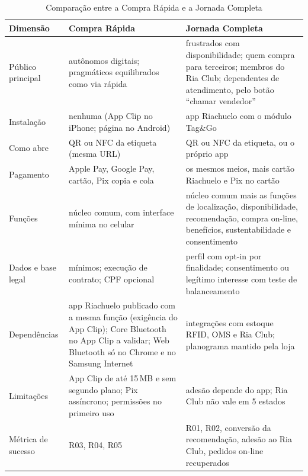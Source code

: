 \begin{table}[htbp]
    \centering
    \caption{Comparação entre a Compra Rápida e a Jornada Completa}
    \label{tab:r2-caminhos}
    \footnotesize
    \renewcommand{\arraystretch}{1.25}
    \begin{tabularx}{\textwidth}{@{}
        >{\RaggedRight\arraybackslash}p{2.5cm}
        >{\RaggedRight\arraybackslash}X
        >{\RaggedRight\arraybackslash}X@{}}
        \toprule
        \textbf{Dimensão} & \textbf{Compra Rápida} & \textbf{Jornada Completa} \\
        \midrule
        Público principal & autônomos digitais; pragmáticos equilibrados como via rápida & frustrados com disponibilidade; quem compra para terceiros; membros do Ria Club; dependentes de atendimento, pelo botão ``chamar vendedor'' \\
        Instalação & nenhuma (App Clip no iPhone; página no Android) & app Riachuelo com o módulo Tag\&Go \\
        Como abre & QR ou NFC da etiqueta (mesma URL) & QR ou NFC da etiqueta, ou o próprio app \\
        Pagamento & Apple Pay, Google Pay, cartão, Pix copia e cola & os mesmos meios, mais cartão Riachuelo e Pix no cartão \\
        Funções & núcleo comum, com interface mínima no celular & núcleo comum mais as funções de localização, disponibilidade, recomendação, compra on-line, benefícios, sustentabilidade e consentimento \\
        Dados e base legal & mínimos; execução de contrato; CPF opcional & perfil com opt-in por finalidade; consentimento ou legítimo interesse com teste de balanceamento \\
        Dependências & app Riachuelo publicado com a mesma função (exigência do App Clip); Core Bluetooth no App Clip a validar; Web Bluetooth só no Chrome e no Samsung Internet & integrações com estoque RFID, OMS e Ria Club; planograma mantido pela loja \\
        Limitações & App Clip de até 15\,MB e sem segundo plano; Pix assíncrono; permissões no primeiro uso & adesão depende do app; Ria Club não vale em 5 estados \\
        Métrica de sucesso & R03, R04, R05 & R01, R02, conversão da recomendação, adesão ao Ria Club, pedidos on-line recuperados \\
        \bottomrule
    \end{tabularx}
\end{table}

